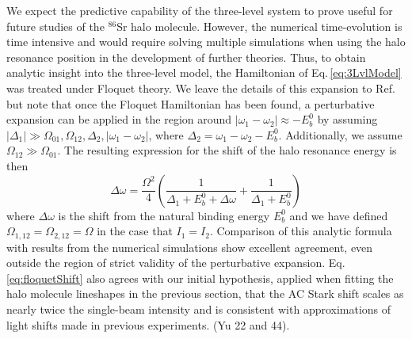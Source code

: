 We expect the predictive capability of the three-level system to prove useful for future studies of the $^{86}$Sr halo molecule.
However, the numerical time-evolution is time intensive and would require solving multiple simulations when using the halo resonance position in the development of further theories.
Thus, to obtain analytic insight into the three-level model, the Hamiltonian of Eq.\,\ref{eq:3LvlModel} was treated under Floquet theory.
We leave the details of this expansion to Ref.\,\cite{Kon2018} but note that once the Floquet Hamiltonian has been found, a perturbative expansion can be applied in the region around $|\omega_1 - \omega_2| \approx -E_b^0$ by assuming $|\Delta_1| \gg \Omega_{01}, \Omega_{12}, \Delta_2, |\omega_1 - \omega_2|$, where $\Delta_2 = \omega_1 - \omega_2 - E_b^0$.
Additionally, we assume $\Omega_{12} \gg \Omega_{01}$.
The resulting expression for the shift of the halo resonance energy is then
\begin{equation} \label{eq:floquetShift}
	\Delta \omega = \frac{\Omega^2}{4} \left( \frac{1}{\Delta_1 + E_b^0 + \Delta\!\omega} + \frac{1}{\Delta_1 + E_b^0} \right)
\end{equation}
where $\Delta\omega$ is the shift from the natural binding energy $E_b^0$ and we have defined $\Omega_{1,12}=\Omega_{2,12}=\Omega$ in the case that $I_1=I_2$.
Comparison of this analytic formula with results from the numerical simulations show excellent agreement, even outside the region of strict validity of the perturbative expansion.
Eq.\,\ref{eq:floquetShift} also agrees with our initial hypothesis, applied when fitting the halo molecule lineshapes in the previous section, that the AC Stark shift scales as nearly twice the single-beam intensity and is consistent with approximations of light shifts made in previous experiments. (Yu 22 and 44).

